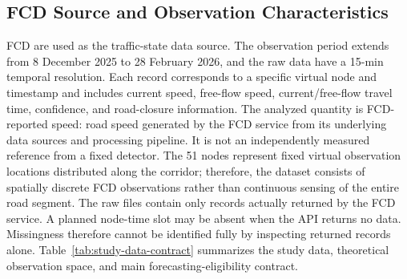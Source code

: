 \documentclass[pdflatex,sn-mathphys-num,iicol]{sn-jnl}
\begin{document}
\subsection{FCD Source and Observation Characteristics}
\label{subsec:fcd-source}

FCD are used as the traffic-state data source. The observation period extends from 8 December 2025 to 28 February 2026, and the raw data have a 15-min temporal resolution. Each record corresponds to a specific virtual node and timestamp and includes current speed, free-flow speed, current/free-flow travel time, confidence, and road-closure information. The analyzed quantity is FCD-reported speed: road speed generated by the FCD service from its underlying data sources and processing pipeline. It is not an independently measured reference from a fixed detector. The 51 nodes represent fixed virtual observation locations distributed along the corridor; therefore, the dataset consists of spatially discrete FCD observations rather than continuous sensing of the entire road segment. The raw files contain only records actually returned by the FCD service. A planned node-time slot may be absent when the API returns no data. Missingness therefore cannot be identified fully by inspecting returned records alone. Table~\ref{tab:study-data-contract} summarizes the study data, theoretical observation space, and main forecasting-eligibility contract.


\end{document}
